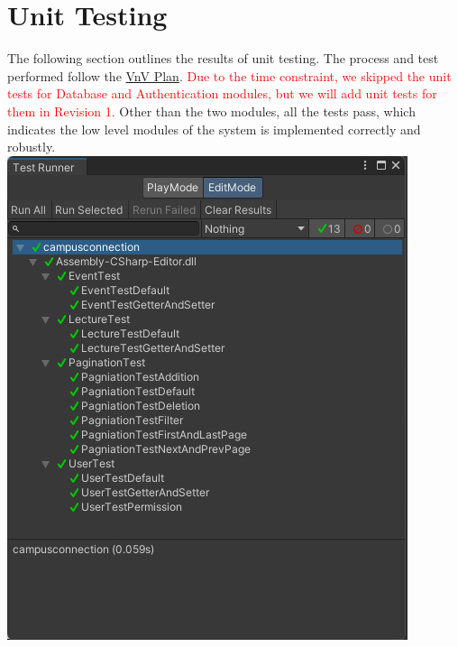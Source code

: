 \documentclass[12pt, titlepage]{article}
\begin{document}
\section{Unit Testing}
The following section outlines the results of unit testing. The process and test performed follow the \href{https://github.com/beatlepie/4G06CapstoneProjectTeam2/blob/main/docs/VnVPlan/VnVPlan.pdf}{VnV Plan}. \textcolor{red}{Due to the time constraint, we skipped the unit tests for Database and Authentication modules, but we will add unit tests for them in Revision 1.} Other than the two modules, all the tests pass, which indicates the low level modules of the system is implemented correctly and robustly.\\
\includegraphics[scale=1]{Unit Test.png}
\end{document}
